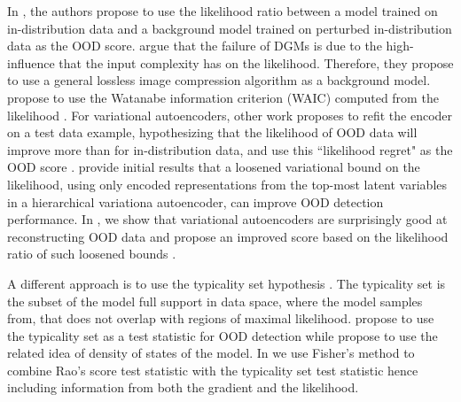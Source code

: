 In \textcite{ren_likelihood_2019}, the authors propose to use the likelihood ratio between a model trained on in-distribution data and a background model trained on perturbed in-distribution data as the OOD score. 
\textcite{serra_input_2020} argue that the failure of DGMs is due to the high-influence that the input complexity has on the likelihood. Therefore, they propose to use a general lossless image compression algorithm as a background model. 
\textcite{choi_waic_2019} propose to use the Watanabe information criterion (WAIC) computed from the likelihood \parencite{watanabe_algebraic_2009, watanabe_asymptotic_2010}. 
For variational autoencoders, other work proposes to refit the encoder on a test data example, hypothesizing that the likelihood of OOD data will improve more than for in-distribution data, and use this ``likelihood regret" as the OOD score \parencite{xiao_likelihood_2020}. 
\textcite{maaloe_biva_2019} provide initial results that a loosened variational bound on the likelihood, using only encoded representations from the top-most latent variables in a hierarchical variationa autoencoder, can improve OOD detection performance. In \textcite{havtorn_hierarchical_2021}, we show that variational autoencoders are surprisingly good at reconstructing OOD data and propose an improved score based on the likelihood ratio of such loosened bounds \textcite{maaloe_biva_2019}.

A different approach is to use the typicality set hypothesis \parencite{nalisnick_detecting_2019}. The typicality set is the subset of the model full support in data space, where the model samples from, that does not overlap with regions of maximal likelihood. \textcite{nalisnick_detecting_2019} propose to use the typicality set as a test statistic for OOD detection while \textcite{morningstar_density_2021} propose to use the related idea of density of states of the model. 
In \textcite{bergamin_modelagnostic_2022} we use Fisher's method \parencite{fisher_statistical_1925} to combine Rao's score test statistic \parencite{rao_large_1948} with the typicality set test statistic hence including information from both the gradient and the likelihood.


